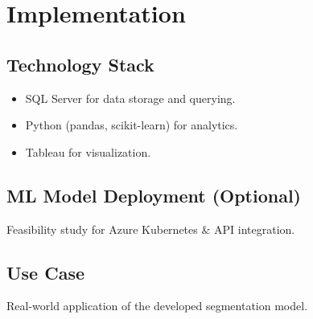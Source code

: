 \chapter{Implementation}

\section{Technology Stack}
\begin{itemize}
    \item SQL Server for data storage and querying.
    \item Python (pandas, scikit-learn) for analytics.
    \item Tableau for visualization.
\end{itemize}

\section{ML Model Deployment (Optional)}
Feasibility study for Azure Kubernetes \& API integration.

\section{Use Case}
Real-world application of the developed segmentation model.